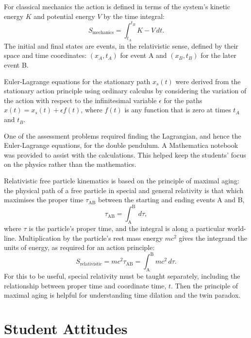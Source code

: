 \documentclass[prb,oncolumn]{revtex4-2}
\begin{document}
For classical mechanics the action is defined in terms of the system's kinetic energy $K$ and potential energy $V$ by the time integral:
%
\begin{equation} \label{action}
S_\textrm{mechanics} = \int_{t_A}^{t_B} K-V \, dt .
\end{equation}
%
The initial and final states are events, in the relativistic sense, defined by their space and time coordinates: $(x_A,t_A)$ for event A and $(x_B,t_B)$ for the later event B.

Euler-Lagrange equations for the stationary path $x_s(t)$ were derived from the stationary action principle using ordinary calculus by considering the variation of the action with respect to the infinitesimal variable $\epsilon$ for the paths $x(t) = x_s(t)+\epsilon f(t)$, where $f(t)$ is any function that is zero at times $t_A$ and $t_B$. \cite{HancAJP2004b} 

One of the assessment problems required finding the Lagrangian, and hence the Euler-Lagrange equations, for the double pendulum. A Mathematica notebook was provided to assist with the calculations. \cite{Mathematica, supplement} This helped keep the students' focus on the physics rather than the mathematics.

Relativistic free particle kinematics is based on the principle of maximal aging: \cite{TaylorandWheeler} the physical path of a free particle in special and general relativity is that which maximises the proper time $\tau_\textrm{AB}$ between the starting and ending events A and B,
%
\begin{equation} \label{maximal aging}
\tau_\textrm{AB} = \int_\textrm{A}^\textrm{B}  \, d\tau ,
\end{equation}
%
where $\tau$ is the particle's proper time, and the integral is along a particular world-line. \cite{GR} Multiplication by the particle's rest mass energy $m c^2$ gives the integrand the units of energy, as required for an action principle:
%
\begin{equation} \label{maximal aging rest mass}
S_\textrm{relativistic} = m c^2 \tau_\textrm{AB} = \int_\textrm{A}^\textrm{B} m c^2  \, d\tau .
\end{equation}
%
For this to be useful, special relativity must be taught separately, including the relationship between proper time and coordinate time, $t$. Then the principle of maximal aging is helpful for understanding time dilation and the twin paradox. \cite{Taylor2003,TaylorandWheeler}

\section{Student Attitudes}
\label{Student Attitudes}
\end{document}

